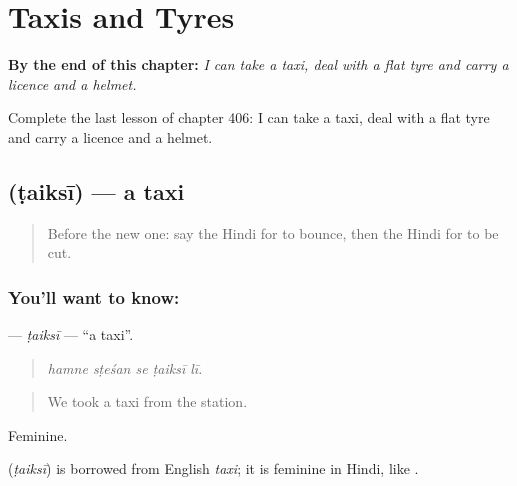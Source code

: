 
\chapter{Taxis and Tyres}
\label{ch:hi-taxis-and-tyres}

\begin{chapteropening}
\textbf{By the end of this chapter:} \emph{I can take a taxi, deal with a flat tyre and carry a licence and a helmet.}

Complete the last lesson of chapter 406: I can take a taxi, deal with a flat tyre and carry a licence and a helmet.
\end{chapteropening}

\section[\texorpdfstring{\hi{टैक्सी} (ṭaiksī)}{टैक्सी (ṭaiksī)}]{ (ṭaiksī) — a taxi}

\label{lesson:HI-C406-taiksi}



\begin{quote}
Before the new one: say the Hindi for to bounce, then the Hindi for to be cut.
\end{quote}

\subsection*{You'll want to know: }
\textbf{} — \emph{ṭaiksī} — \textquotedblleft{}a taxi\textquotedblright{}.

\begin{quote}
    
\end{quote}

\begin{quote}
\emph{hamne sṭeśan se ṭaiksī lī.}
\end{quote}

\begin{quote}
We took a taxi from the station.
\end{quote}

Feminine.

\begin{cousinweb}
\textbf{} (\emph{ṭaiksī}) is borrowed from English \emph{taxi}; it is feminine in Hindi, like .
\end{cousinweb}

